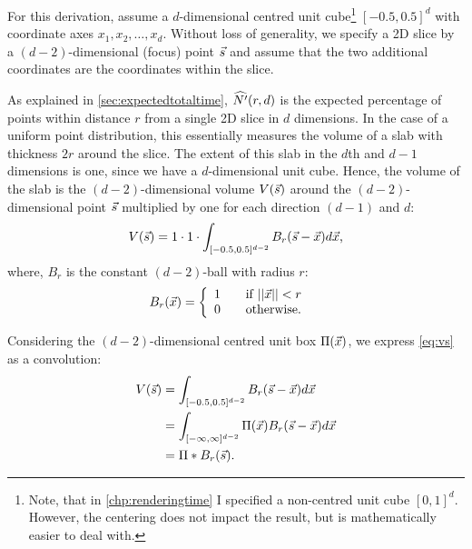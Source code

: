 

For this derivation, assume a $d$-dimensional centred unit
cube\footnote{Note, that in \autoref{chp:renderingtime} I specified a
non-centred unit cube $[0, 1]^d$. However, the centering does not impact the
result, but is mathematically easier to deal with.} $[-0.5, 0.5]^d$ with
coordinate axes $x_1, x_2, \ldots, x_d$. Without loss of generality, we
specify a 2D slice by a $(d-2)$-dimensional (focus) point $\vec{s}$ and 
assume that the two additional coordinates are the coordinates within the
slice.

As explained in \autoref{sec:expectedtotaltime}, $\widehat{N'}(r, d)$ is the expected
percentage of points within distance $r$ from a single 2D slice in $d$
dimensions. In the case of a uniform point distribution, this essentially
measures the volume of a slab with thickness $2r$ around the slice. The extent
of this slab in the $d$th and $d-1$ dimensions is one, since we have a
$d$-dimensional unit cube. Hence, the volume of the slab is the
$(d-2)$-dimensional volume $V(\vec{s})$ around the $(d-2)$-dimensional point $\vec{s}$
multiplied by one for each direction $(d-1)$ and $d$:
\begin{equation}
  V(\vec{s}) = 1 \cdot 1 \cdot \int_{[-0.5,0.5]^{d-2}} B_r(\vec{s}-\vec{x}) d\vec{x} \text{,}
   \label{eq:vs}
\end{equation}
where, $B_r$ is the constant $(d-2)$-ball with radius $r$:
\begin{align*}
  B_r(\vec{x}) &= \left\{ 
  \begin{array}{l l}
    1 & \quad \text{if $||\vec{x}||<r$}\\
    0 & \quad \text{otherwise} \text{.}\\
  \end{array} \right. 
\end{align*}


Considering the $(d-2)$-dimensional centred unit box $\Pi(\vec{x})$, we express \autoref{eq:vs} as a convolution:
\begin{align*}
  V(\vec{s}) &= \int_{[-0.5,0.5]^{d-2}} B_r(\vec{s}-\vec{x}) d\vec{x}\\
          &= \int_{[-\infty,\infty]^{d-2}} \Pi(\vec{x}) B_r(\vec{s}-\vec{x}) d\vec{x} \\
          &= \Pi * B_r(\vec{s}) \text{.}
\end{align*}

